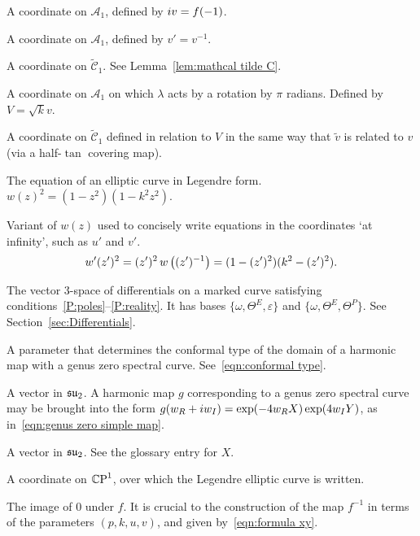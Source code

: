 \begin{description}[align=right]
\item[$v$] A coordinate on $\mathcal{A}_1$, defined by $i v = f(-1)$.

\item[$v'$] A coordinate on $\mathcal{A}_1$, defined by $v' = v^{-1}$.

\item[$\tilde{v}$] A coordinate on $\mathcal{\tilde{C}}_1$. See Lemma~\ref{lem:mathcal tilde C}.

\item[$V$] A coordinate on $\mathcal{A}_1$ on which $λ$ acts by a rotation by $π$ radians. Defined by $V=\sqrt{k} v$.

\item[$\tilde{V}$] A coordinate on $\mathcal{\tilde{C}}_1$ defined in relation to $V$ in the same way that $\tilde{v}$ is related to $v$ (via a half-$\tan$ covering map).

\item[$w(z)$] The equation of an elliptic curve in Legendre form. $w(z)^2 = (1-z^2)(1-k^2z^2)$.

\item[$w'(z')$] Variant of $w(z)$ used to concisely write equations in the coordinates `at infinity', such as $u'$ and $v'$.
\[
w'(z')^2 = (z')^2\,w\left((z')^{-1}\right) =  (1-(z')^2)(k^2 - (z')^2).
\]


\item[$W$] The vector $3$-space of differentials on a marked curve satisfying conditions~\ref{P:poles}--\ref{P:reality}. It has bases $\{ ω, Θ^E, ε \}$ and $\{ ω, Θ^E, Θ^P \}$. See Section~\ref{sec:Differentials}.

\item[$x$] A parameter that determines the conformal type of the domain of a harmonic map with a genus zero spectral curve. See~\eqref{eqn:conformal type}.

\item[$X$] A vector in $\mathfrak{su}_2$. A harmonic map $g$ corresponding to a genus zero spectral curve may be brought into the form $g(w_R + i w_I) = \exp (-4w_R X) \exp (4w_I Y)$, as in~\eqref{eqn:genus zero simple map}.

\item[$Y$] A vector in $\mathfrak{su}_2$. See the glossary entry for $X$.

\item[$z$] A coordinate on $\CP^1$, over which the Legendre elliptic curve is written.

\item[$z_0$] The image of $0$ under $f$. It is crucial to the construction of the map $f^{-1}$ in terms of the parameters $(p,k,u,v)$, and given by~\eqref{eqn:formula xy}.







\end{description}
